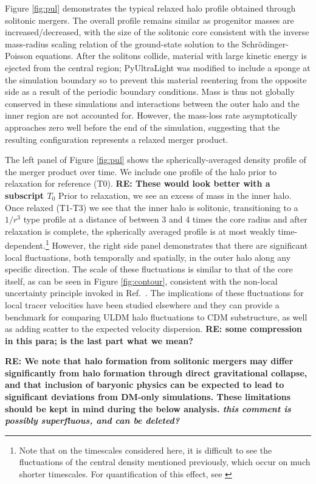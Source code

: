\documentclass[a4paper,11pt]{article}
\newcommand{\re}[1]{{{\bf \color{green} RE: #1}}}
\begin{document}
Figure \ref{fig:pul} demonstrates the typical relaxed halo profile obtained through solitonic mergers. The overall profile remains similar as progenitor masses are increased/decreased, with the size of the solitonic core consistent with the inverse mass-radius scaling relation of the ground-state solution to the Schr{\"o}dinger-Poisson equations. After the solitons collide,  material with large kinetic energy is ejected from the central region; {\sc PyUltraLight} was modified to include a sponge at the simulation boundary so to prevent this material  reentering from the opposite side as a result of the periodic boundary conditions. Mass is thus not globally conserved in these simulations and  interactions between the outer halo and the inner region are not accounted for.  However, the mass-loss rate asymptotically approaches zero well before the end of the simulation, suggesting that  the resulting configuration represents a relaxed merger product. 

The left panel of Figure \ref{fig:pul} shows the spherically-averaged density profile of the merger product over time. We include one profile of the halo prior to relaxation for reference (T0). \re{These would look better with a subscript $T_0$} Prior to relaxation, we see an excess of mass in the inner halo. Once relaxed (T1-T3) we see that the inner halo is solitonic, transitioning to a $1/r^3$ type profile at a distance of between 3 and 4 times the core radius and after relaxation is complete, the spherically averaged profile is at most weakly time-dependent.\footnote{Note that on the timescales considered here, it is difficult to see the fluctuations of the central density mentioned previously, which occur on much shorter timescales. For quantification of this effect, see \cite{Veltmaat:2018dfz}} However, the right side panel demonstrates that there are significant local fluctuations, both temporally and spatially,  in the outer halo along any specific direction. The  scale of these fluctuations is similar to that of the core itself, as can be seen in Figure \ref{fig:contour}, consistent with the non-local uncertainty principle invoked in Ref.~\cite{Schive:2014hza}. The implications of these fluctuations for local tracer velocities have been studied elsewhere \cite{Marsh:2018zyw} and they can provide a  benchmark for comparing ULDM halo fluctuations to CDM substructure, as well as adding scatter to the expected velocity dispersion. \re{some compression in this para; is the last part what we mean? }

\re{We note that halo formation from solitonic mergers may differ significantly from halo formation through direct gravitational collapse, and that inclusion of baryonic physics can be expected to lead to significant deviations from DM-only simulations. These limitations should be kept in mind during the below analysis.  {\it this comment is possibly superfluous, and can be deleted?}}
\end{document}
